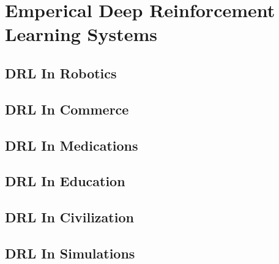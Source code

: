 %
%
%
\chapter{Emperical Deep Reinforcement Learning Systems}
\label{intro} %

\section{DRL In Robotics}
\section{DRL In Commerce}
\section{DRL In Medications}
\section{DRL In Education}
\section{DRL In Civilization}
\section{DRL In Simulations}




